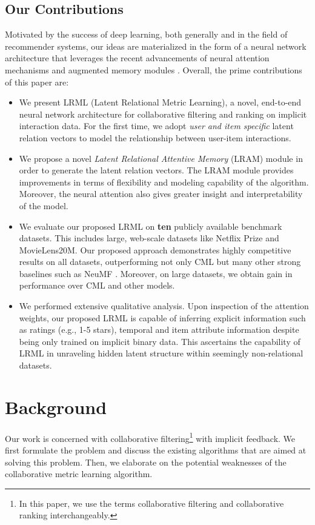 \documentclass[sigconf]{acmart}
\begin{document}
\subsection{Our Contributions}

Motivated by the success of deep learning, both generally and in the field of recommender systems, our ideas are materialized in the form of a neural network architecture that leverages the recent advancements of neural attention mechanisms and augmented memory modules \cite{DBLP:conf/nips/SukhbaatarSWF15}. Overall, the prime contributions of this paper are:

\begin{itemize}
\item We present \textsc{LRML} (Latent Relational Metric Learning), a novel, end-to-end neural network architecture for collaborative filtering and ranking on implicit interaction data. For the first time, we adopt \textit{user and item specific} latent relation vectors to model the relationship between user-item interactions. 
\item We propose a novel \emph{Latent Relational Attentive Memory} (LRAM) module in order to generate the latent relation vectors. The LRAM module provides improvements in terms of flexibility and modeling capability of the algorithm. Moreover, the neural attention also gives greater insight and interpretability of the model. 
\item We evaluate our proposed \textsc{LRML} on \textbf{ten} publicly available benchmark datasets. This includes large, web-scale datasets like Netflix Prize and MovieLens20M. Our proposed approach demonstrates highly competitive results on all datasets, outperforming not only CML but many other strong baselines such as NeuMF \cite{He:2017:NCF:3038912.3052569}. Moreover, on large datasets, we obtain  gain in performance over CML and other models.   
\item We performed extensive qualitative analysis. Upon inspection of the attention weights, our proposed \textsc{LRML} is capable of inferring explicit information such as ratings (e.g., 1-5 stars), temporal and item attribute information despite being only trained on implicit binary data. This ascertains the capability of \textsc{LRML} in unraveling hidden latent structure within seemingly non-relational datasets. 
\end{itemize}


\section{Background}
Our work is concerned with collaborative filtering\footnote{In this paper, we use the terms collaborative filtering and collaborative ranking interchangeably.} with implicit feedback. We first formulate the problem and discuss the existing algorithms that are aimed at solving this problem. Then, we elaborate on the potential weaknesses of the collaborative metric learning algorithm.
\end{document}
